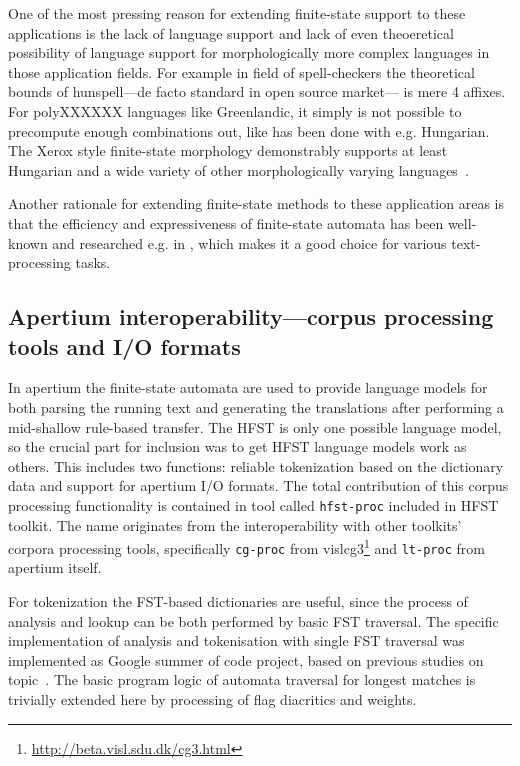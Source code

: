 \documentclass{llncs}
\begin{document}
One of the most pressing reason for extending finite-state support to these
applications is the lack of language support and lack of even theoeretical
possibility of language support for morphologically more complex languages
in those application fields. For example in field of spell-checkers the
theoretical bounds of hunspell---de facto standard in open source market---
is mere 4 affixes. For polyXXXXXX languages like Greenlandic, it simply is
not possible to precompute enough combinations out, like has been done with
e.g. Hungarian. The Xerox style finite-state morphology demonstrably supports
at least Hungarian and a wide variety of other morphologically varying
languages~\cite{beesley/2003}.

Another rationale for extending finite-state methods to these application areas
is that the efficiency and expressiveness of finite-state automata has been
well-known and researched e.g. in \cite{aho/2007}, which makes it a good choice
for various text-processing tasks.

\subsection{Apertium interoperability---corpus processing tools and I/O formats}

In apertium the finite-state automata are used to provide language models for
both parsing the running text and generating the translations after performing
a mid-shallow rule-based transfer. The HFST is only one possible language
model, so the crucial part for inclusion was to get HFST language models
work as others. This includes two functions: reliable tokenization based on
the dictionary data and support for apertium I/O formats. The total
contribution of this corpus processing functionality is contained in tool
called \texttt{hfst-proc} included in HFST toolkit. The name originates from
the interoperability with other toolkits' corpora processing tools, specifically
\texttt{cg-proc} from vislcg3\footnote{\url{http://beta.visl.sdu.dk/cg3.html}} and
\texttt{lt-proc} from apertium itself.

For tokenization the FST-based dictionaries are useful, since the process of
analysis and lookup can be both performed by basic FST traversal. The specific
implementation of analysis and tokenisation with single FST traversal was
implemented as Google summer of code project, based on previous studies on
topic~\cite{garrido-alenda/2002}. The basic program logic of automata traversal
for longest matches is trivially extended here by processing of flag diacritics
and weights.
\end{document}
